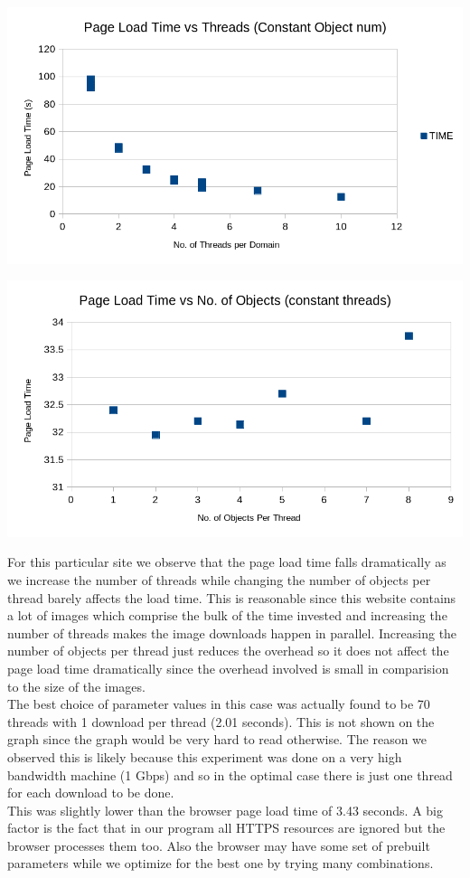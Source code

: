 \documentclass[12pt]{article}
\begin{document}
\includegraphics[scale=1]{q4_1.png}

\includegraphics[scale=1]{q4_2.png}

For this particular site we observe that the page load time falls dramatically as we increase the number of threads while changing the number of objects per thread barely affects the load time.  This is reasonable since this website contains a lot of images which comprise the bulk of the time invested and increasing the number of threads makes the image downloads happen in parallel. Increasing the number of objects per thread just reduces the overhead so it does not affect the page load time dramatically since the overhead involved is small in comparision to the size of the images.\\
 The best choice of parameter values in this case was actually found to be  70 threads with 1 download per thread (2.01 seconds). This is not shown on the graph since the graph would be very hard to read otherwise. The reason we observed this is likely because this experiment was done on a very high bandwidth machine (1 Gbps) and so in the optimal case there is just one thread for each download to be done.\\
This was slightly lower than the browser page load time of 3.43 seconds. A big factor  is the fact that in our program all HTTPS resources are ignored but the browser processes them too. Also the browser may have some set of prebuilt parameters while we optimize for the best one by trying  many combinations.
\end{document}
